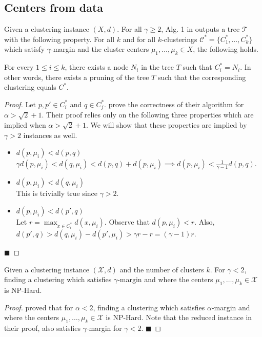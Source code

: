 \documentclass[orivec]{llncs}
\newcommand{\mc}{\mathcal}
\renewcommand{\qed}{\hfill\ensuremath{\blacksquare}}
\begin{document}
\subsection{Centers from data}
\begin{theorem}
\label{thm:upperCenterData}
Given a clustering instance $(X , d)$. For all $\gamma \ge 2$, Alg. 1 in \cite{balcan2012clustering} outputs a tree $\mc T$ with the following property. For all $k$ and for all $k$-clusterings $\mc C^* = \{C_1^*, \ldots, C_k^* \}$ which satisfy $\gamma$-margin and the cluster centers $\mu_1, \ldots, \mu_k \in X$, the following holds.

For every $1 \le i \le k$, there exists a node $N_i$ in the tree $T$ such that $C_i^* = N_i$. In other words, there exists a pruning of the tree $T$ such that the corresponding clustering equals $C^*$. 
\end{theorem}

\begin{proof}
Let $p, p' \in C_i^*$ and $q \in C_j^*$. \cite{balcan2012clustering} prove the correctness of their algorithm for $\alpha > \sqrt{2} + 1$. Their proof relies only on the following three properties which are implied when $\alpha > \sqrt{2} + 1$. We will show that these properties are implied by $\gamma > 2$ instances as well.
\begin{itemize}[nolistsep,noitemsep]
\item $d(p, \mu_i) < d(p, q)$\\
$\gamma d(p, \mu_i) < d(q, \mu_i) < d(p, q) + d(p, \mu_i) \implies d(p, \mu_i) < \frac{1}{\gamma-1}d(p, q)$.
\item $d(p, \mu_i) < d(q, \mu_i)$\\
This is trivially true since $\gamma > 2$.
\item $d(p, \mu_i) < d(p', q)$\\
Let $r = \max_{x \in C_i^*} d(x, \mu_i)$. Observe that $d(p, \mu_i) < r$. Also, $d(p', q)> d(q, \mu_i)-d(p', \mu_i) > \gamma r - r = (\gamma -1)r$.
\end{itemize}
\qed
\end{proof}

\begin{theorem}
\label{thm:lowerCenterData}
Given a clustering instance $(\mc X, d)$ and the number of clusters $k$. For $\gamma < 2$, finding a clustering which satisfies $\gamma$-margin and where the centers $\mu_1, \ldots, \mu_k \in \mc X$ is NP-Hard.
\end{theorem}
\begin{proof}
\cite{ben2014data} proved that for $\alpha < 2$, finding a clustering which satisfies $\alpha$-margin and where the centers $\mu_1, \ldots, \mu_k \in \mc X$ is NP-Hard. Note that the reduced instance in their proof, also satisfies $\gamma$-margin for $\gamma < 2$. 
\qed
\end{proof}
\end{document}
